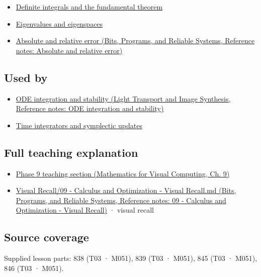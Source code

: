 \begin{itemize}
\tightlist
\item
  \hyperref[appendix-1a50e72435c2]{Definite integrals and the fundamental theorem}
\item
  \hyperref[appendix-0b3be18411f9]{Eigenvalues and eigenspaces}
\item
  \href{../01-Bits-Programs-and-Reliable-Systems/main.pdf\#nameddest=appendix-3ae74e89b4e6}{Absolute and relative error (Bits, Programs, and Reliable Systems, Reference notes: Absolute and relative error)}
\end{itemize}

\subsection{Used by}\label{appendix-e8ab9836882e-used-by}

\hypertarget{appendix-e8ab9836882e-used-by}{}

\begin{itemize}
\tightlist
\item
  \href{../04-Light-Transport-and-Image-Synthesis/main.pdf\#nameddest=appendix-18eacf61a04b}{ODE integration and stability (Light Transport and Image Synthesis, Reference notes: ODE integration and stability)}
\item
  \hyperref[appendix-8f96f9c4d5bc]{Time integrators and symplectic updates}
\end{itemize}

\subsection{Full teaching explanation}\label{appendix-e8ab9836882e-full-teaching-explanation}

\hypertarget{appendix-e8ab9836882e-full-teaching-explanation}{}

\begin{itemize}
\tightlist
\item
  \href{../02-Mathematics-for-Visual-Computing/main.pdf\#nameddest=02-foundations-ii-ch025-odes-and-numerical-simulation}{Phase 9 teaching section (Mathematics for Visual Computing, Ch. 9)}
\item
  \href{../01-Bits-Programs-and-Reliable-Systems/main.pdf\#nameddest=appendix-adf48f5dc5c1}{Visual Recall/09 - Calculus and Optimization - Visual Recall.md (Bits, Programs, and Reliable Systems, Reference notes: 09 - Calculus and Optimization - Visual Recall)} · visual recall
\end{itemize}

\subsection{Source coverage}\label{appendix-e8ab9836882e-source-coverage}

\hypertarget{appendix-e8ab9836882e-source-coverage}{}

Supplied lesson parts: 838 (T03 · M051), 839 (T03 · M051), 845 (T03 · M051), 846 (T03 · M051).
